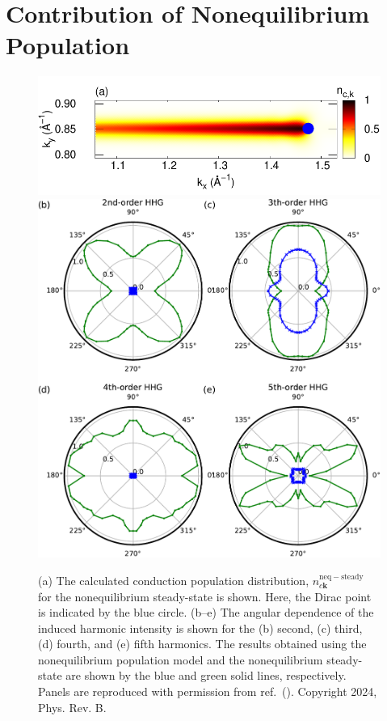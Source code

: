 \section{Contribution of Nonequilibrium Population}
\begin{figure}[htp]
	\center
	\includegraphics[width=0.8\linewidth]{pic/pop_dist.pdf}
	\includegraphics[width=0.8\linewidth]{pic/pop_c.pdf}
	\caption{\label{fig:pop}
		(a) The calculated conduction population distribution, $n^{\mathrm{neq-steady}}_{c\mathbf k}$ for the nonequilibrium steady-state is shown. Here, the Dirac point is indicated by the blue circle. (b--e) The angular dependence of the induced harmonic intensity is shown for the (b) second, (c) third, (d) fourth, and (e) fifth harmonics. The results obtained using the nonequilibrium population model and the nonequilibrium steady-state are shown by the blue and green solid lines, respectively. Panels are reproduced with permission from ref.~(\cite{PhysRevB.109.045421}). Copyright 2024, Phys. Rev. B.
	}
\end{figure}

